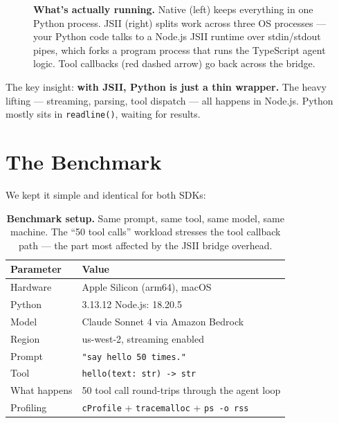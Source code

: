 \documentclass[11pt]{article}
\begin{document}
\begin{figure}[H]
\caption{\textbf{What's actually running.} Native (left) keeps everything in one Python process. JSII (right) splits work across three OS processes — your Python code talks to a Node.js JSII runtime over stdin/stdout pipes, which forks a program process that runs the TypeScript agent logic. Tool callbacks (red dashed arrow) go back across the bridge.}
\label{fig:arch}
\end{figure}

The key insight: \textbf{with JSII, Python is just a thin wrapper.} The heavy lifting — streaming, parsing, tool dispatch — all happens in Node.js. Python mostly sits in \texttt{readline()}, waiting for results.

\section{The Benchmark}

We kept it simple and identical for both SDKs:

\begin{table}[H]
\centering
\renewcommand{\arraystretch}{1.3}
\begin{tabularx}{0.85\textwidth}{@{}lX@{}}
\toprule
\textbf{Parameter} & \textbf{Value} \\
\midrule
Hardware & Apple Silicon (arm64), macOS \\
Python & 3.13.12 \quad Node.js: 18.20.5 \\
Model & Claude Sonnet 4 via Amazon Bedrock \\
Region & us-west-2, streaming enabled \\
Prompt & \texttt{"say hello 50 times."} \\
Tool & \texttt{hello(text: str) -> str} \\
What happens & 50 tool call round-trips through the agent loop \\
Profiling & \texttt{cProfile} + \texttt{tracemalloc} + \texttt{ps -o rss} \\
\bottomrule
\end{tabularx}
\caption{\textbf{Benchmark setup.} Same prompt, same tool, same model, same machine. The ``50 tool calls'' workload stresses the tool callback path — the part most affected by the JSII bridge overhead.}
\end{table}
\end{document}
